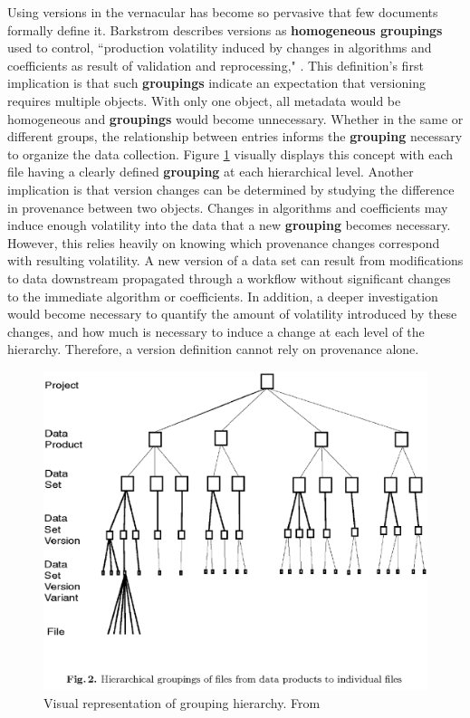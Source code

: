 Using versions in the vernacular has become so pervasive that few documents formally define it.
Barkstrom describes versions as \textbf{homogeneous groupings} used to control, ``production volatility induced by changes in algorithms and coefficients as result of validation and reprocessing," \cite{Barkstrom2003}.
This definition's first implication is that such \textbf{groupings} indicate an expectation that versioning requires multiple objects.
With only one object, all metadata would be homogeneous and \textbf{groupings} would become unnecessary.
Whether in the same or different groups, the relationship between entries informs the \textbf{grouping} necessary to organize the data collection.
Figure \ref{hierarchy} visually displays this concept with each file having a clearly defined \textbf{grouping} at each hierarchical level.
Another implication is that version changes can be determined by studying the difference in provenance between two objects.
Changes in algorithms and coefficients may induce enough volatility into the data that a new \textbf{grouping} becomes necessary.
However, this relies heavily on knowing which provenance changes correspond with resulting volatility.
A new version of a data set can result from modifications to data downstream propagated through a workflow without significant changes to the immediate algorithm or coefficients.
In addition, a deeper investigation would become necessary to quantify the amount of volatility introduced by these changes, and how much is necessary to induce a change at each level of the hierarchy.
Therefore, a version definition cannot rely on provenance alone.

\begin{figure}
	\centering
	\includegraphics[scale=0.50]{figures/hierarchy.png}
	\caption[Visual representation of grouping hierarchy.]{Visual representation of grouping hierarchy.  From \cite{Barkstrom2003}}
	\label{hierarchy}
\end{figure}

